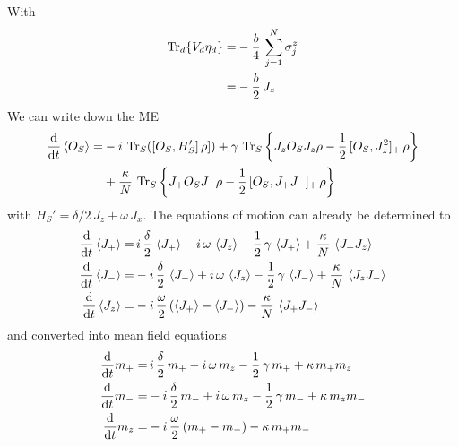 \documentclass{article}
\begin{document}
With 
\begin{align*}
    \operatorname{Tr}_d\{V_d\eta_d\}=&-\frac{b}{4}\,\sum_{j=1}^N\sigma_j^z\\
    =&-\frac{b}{2}\,J_z
\end{align*}
We can write down the ME
\begin{align*}
    \frac{\text{d}}{\text{d}t}\braket{O_S}=&-i\,\operatorname{Tr}_S([O_S,H_S']\,\rho])+\gamma\,\operatorname{Tr}_S\left\{J_z O_S J_z \rho-\frac{1}{2}\,[O_S,J_z^2]_+\,\rho\right\}\\
    &+\frac{\kappa}{N}\,\operatorname{Tr}_S\left\{J_+ O_S J_- \rho-\frac{1}{2}\,[O_S,J_+ J_-]_+\,\rho\right\}
\end{align*}
with $H_S'=\delta/2\,J_z+\omega\,J_x$. The equations of motion can already be determined to
\begin{align*}
    \frac{\text{d}}{\text{d}t} \braket{J_+}=&\,i\,\frac{\delta}{2}\,\braket{J_+}-i\,\omega\,\braket{J_z}-\frac{1}{2}\,\gamma\,\braket{J_+}+\frac{\kappa}{N}\,\braket{J_+ J_z}\\
    \frac{\text{d}}{\text{d}t} \braket{J_-}=&-i\,\frac{\delta}{2}\,\braket{J_-}+i\,\omega\,\braket{J_z}-\frac{1}{2}\,\gamma\,\braket{J_-}+\frac{\kappa}{N}\,\braket{J_z J_-}\\
    \frac{\text{d}}{\text{d}t} \braket{J_z}=&-i\,\frac{\omega}{2}\,(\braket{J_+} - \braket{J_-}) - \frac{\kappa}{N}\,\braket{J_+ J_-}    
\end{align*}
and converted into mean field equations
\begin{align*}
    \frac{\text{d}}{\text{d}t} m_+=&\,i\,\frac{\delta}{2}\,m_+-i\,\omega\,m_z-\frac{1}{2}\,\gamma\,m_++\kappa\,m_+ m_z\\
    \frac{\text{d}}{\text{d}t} m_-=&-i\,\frac{\delta}{2}\,m_-+i\,\omega\,m_z-\frac{1}{2}\,\gamma\,m_- +\kappa\,m_z m_-\\
    \frac{\text{d}}{\text{d}t} m_z=&-i\,\frac{\omega}{2}\,(m_+ - m_-) - \kappa\,m_+ m_-    
\end{align*}
\end{document}
